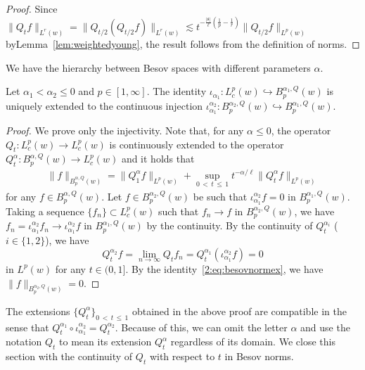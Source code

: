 \documentclass[AHL,Unicode,longabstracts,published]{cedram}
\newcommand{\mfs}{\mathfrak{s}}
\begin{document}
\begin{proof}
Since $\|Q_tf\|_{L^r(w)}=\|Q_{t/2}(Q_{t/2}f)\|_{L^r(w)}\lesssim t^{-\frac{|\mfs|}\ell(\frac1p-\frac1r)}\|Q_{t/2}f\|_{L^p(w)}$ by\linebreak Lemma~\ref{lem:weightedyoung}, the result follows from the definition of norms.
\end{proof}

We have the hierarchy between Besov spaces with different parameters $\alpha$.

\begin{prop}\label{prop:abinjection}
Let $\alpha_1<\alpha_2\le0$ and $p\in[1,\infty]$. The identity $\iota_{\alpha_1}:L_c^p(w)\hookrightarrow B_p^{\alpha_1,Q}(w)$ is uniquely extended to the continuous injection $\iota_{\alpha_1}^{\alpha_2}:B_p^{\alpha_2,Q}(w)\hookrightarrow B_p^{\alpha_1,Q}(w)$.
\end{prop}

\begin{proof}
We prove only the injectivity. Note that, for any $\alpha\le0$, the operator $Q_t:L_c^p(w)\to L_c^p(w)$ is continuously extended to the operator $Q_t^\alpha:B_p^{\alpha,Q}(w)\to L_c^p(w)$ and it holds that
\begin{align}\label{2:eq:besovnormex}
\|f\|_{B_p^{\alpha,Q}(w)}=\|Q_1^\alpha f\|_{L^p(w)}+\sup_{0\,<\,t\,\le\,1}t^{-\alpha/\ell}\|Q_t^\alpha f\|_{L^p(w)}
\end{align}
for any $f\in B_p^{\alpha,Q}(w)$. Let $f\in B_p^{\alpha_2,Q}(w)$ be such that $\iota_{\alpha_1}^{\alpha_2} f=0$ in $B_p^{\alpha_1,Q}(w)$. Taking a sequence $\{f_n\}\subset L_c^p(w)$ such that $f_n\to f$ in $B_p^{\alpha_2,Q}(w)$, we have $f_n=\iota_{\alpha_1}^{\alpha_2}f_n\to\iota_{\alpha_1}^{\alpha_2}f$ in $B_p^{\alpha_1,Q}(w)$ by the continuity. By the continuity of $Q_t^{\alpha_i}$ ($i\in\{1,2\}$), we have
\[
Q_t^{\alpha_2}f=\lim_{n\to\infty}Q_tf_n=Q_t^{\alpha_1}\left(\iota_{\alpha_1}^{\alpha_2}f\right)=0
\]
in $L^p(w)$ for any $t\in(0,1]$. By the identity~\eqref{2:eq:besovnormex}, we have $\|f\|_{B_p^{\alpha_2,Q}(w)}=0$.
\end{proof}

The extensions $\{Q_t^\alpha\}_{0\,<\,t\,\le\,1}$ obtained in the above proof are compatible in the sense that $Q_t^{\alpha_1}\circ\iota_{\alpha_1}^{\alpha_2}=Q_t^{\alpha_2}$. Because of this, we can omit the letter $\alpha$ and use the notation $Q_t$ to mean its extension $Q_t^\alpha$ regardless of its domain. We close this section with the continuity of $Q_t$ with respect to $t$ in Besov norms.
\end{document}
